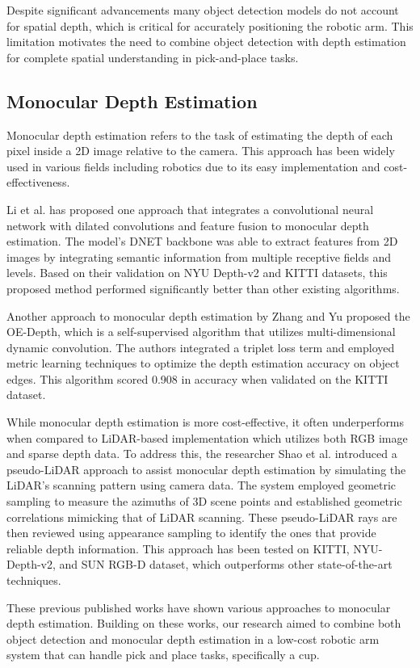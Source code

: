 Despite significant advancements many object detection models do not account for spatial depth, which is critical for accurately positioning the robotic arm. This limitation motivates the need to combine object detection with depth estimation for complete spatial understanding in pick-and-place tasks.

\subsection{Monocular Depth Estimation}
Monocular depth estimation refers to the task of estimating the depth of each pixel inside a 2D image relative to the camera. This approach has been widely used in various fields including robotics due to its easy implementation and cost-effectiveness.


Li et al. \cite{huiyi_li_2024} has proposed one approach that integrates a convolutional neural network with dilated convolutions and feature fusion to monocular depth estimation. The model’s DNET backbone was able to extract features from 2D images by integrating semantic information from multiple receptive fields and levels. Based on their validation on NYU Depth-v2 and KITTI datasets, this proposed method performed significantly better than other existing algorithms.



Another approach to monocular depth estimation by Zhang and Yu \cite{rui_zhang_2024} proposed the OE-Depth, which is a self-supervised algorithm that utilizes multi-dimensional dynamic convolution. The authors integrated a triplet loss term and employed metric learning techniques to optimize the depth estimation accuracy on object edges. This algorithm scored 0.908 in accuracy when validated on the KITTI dataset.



While monocular depth estimation is more cost-effective, it often underperforms when compared to LiDAR-based implementation which utilizes both RGB image and sparse depth data. To address this, the researcher Shao et al. \cite{shuwei_shao_2024} introduced a pseudo-LiDAR approach to assist monocular depth estimation by simulating the LiDAR’s scanning pattern using camera data. The system employed geometric sampling to measure the azimuths of 3D scene points and established geometric correlations mimicking that of LiDAR scanning. These pseudo-LiDAR rays are then reviewed using appearance sampling to identify the ones that provide reliable depth information. This approach has been tested on KITTI, NYU-Depth-v2, and SUN RGB-D dataset, which outperforms other state-of-the-art techniques.



These previous published works have shown various approaches to monocular depth estimation. Building on these works, our research aimed to combine both object detection and monocular depth estimation in a low-cost robotic arm system that can handle pick and place tasks, specifically a cup.
